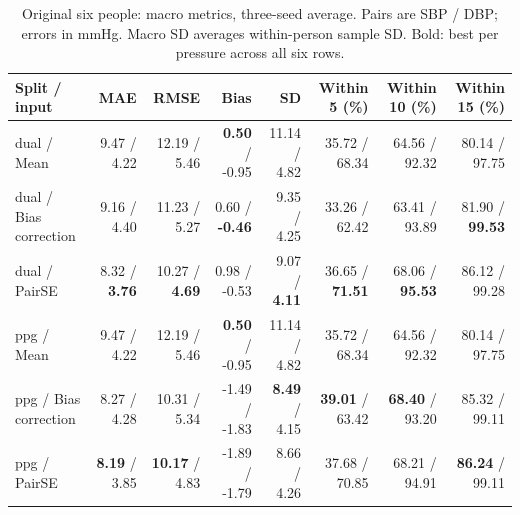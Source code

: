 \begin{table}[t]
\centering\caption{Original six people: macro metrics, three-seed average. Pairs are SBP / DBP; errors in mmHg. Macro SD averages within-person sample SD. Bold: best per pressure across all six rows.}\label{tab:historical_six_macro}
\footnotesize
\setlength{\tabcolsep}{4pt}
\begin{tabular}{lrrrrrrr}\toprule
Split / input & MAE & RMSE & Bias & SD & Within 5 (\%) & Within 10 (\%) & Within 15 (\%)\\\midrule
dual / Mean & 9.47 / 4.22 & 12.19 / 5.46 & \textbf{0.50} / -0.95 & 11.14 / 4.82 & 35.72 / 68.34 & 64.56 / 92.32 & 80.14 / 97.75\\
dual / Bias correction & 9.16 / 4.40 & 11.23 / 5.27 & 0.60 / \textbf{-0.46} & 9.35 / 4.25 & 33.26 / 62.42 & 63.41 / 93.89 & 81.90 / \textbf{99.53}\\
dual / PairSE & 8.32 / \textbf{3.76} & 10.27 / \textbf{4.69} & 0.98 / -0.53 & 9.07 / \textbf{4.11} & 36.65 / \textbf{71.51} & 68.06 / \textbf{95.53} & 86.12 / 99.28\\
ppg / Mean & 9.47 / 4.22 & 12.19 / 5.46 & \textbf{0.50} / -0.95 & 11.14 / 4.82 & 35.72 / 68.34 & 64.56 / 92.32 & 80.14 / 97.75\\
ppg / Bias correction & 8.27 / 4.28 & 10.31 / 5.34 & -1.49 / -1.83 & \textbf{8.49} / 4.15 & \textbf{39.01} / 63.42 & \textbf{68.40} / 93.20 & 85.32 / 99.11\\
ppg / PairSE & \textbf{8.19} / 3.85 & \textbf{10.17} / 4.83 & -1.89 / -1.79 & 8.66 / 4.26 & 37.68 / 70.85 & 68.21 / 94.91 & \textbf{86.24} / 99.11\\
\bottomrule\end{tabular}
\end{table}
